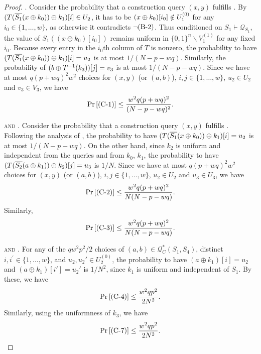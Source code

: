 \begin{proof}
\smallskip
\noindent \textsc{\cone}. Consider the probability that a construction query $(x,y)$ fulfills \cone. By $(T(\overline{S_1}(x\oplus k_0))\oplus k_1)[i]\in U_2$, it has to be $(x\oplus k_0)[i_0]\notin U_1^{(0)}$ for any $i_0\in\{1,\ldots,w\}$, as otherwise it contradicts $\neg\text{(B-2)}$. Thus conditioned on $S_{1} \vdash \mathcal{Q}_{S_{1}}$, the value of $S_1((x \oplus k_0)[i_0])$ remains uniform in $\{0, 1\}^{n} \backslash V_1^{(1)}$ for any fixed $i_0$. Because every entry in the $i_{0}$th column of $T$ is nonzero, the probability to have $(T(\overline{S_1}(x\oplus k_0))\oplus k_1)[i]=u_2$ is at most $1/(N-p-wq)$. Similarly, the probability of $(b\oplus T^{-1}(k_3))[j] = v_3$ is at most $1/(N-p-wq)$. Since we have at most $q(p+wq)^2w^2$ choices for $(x,y)$ (or $(a, b)$), $i, j \in\{1, \ldots, w\}$, $u_{2} \in U_{2}$ and $v_{3} \in V_{3}$, we have
%
%
$$
\operatorname{Pr}\left[\text{(C-1)}\right] \leq \frac{w^{2} q (p+w q)^{2}}{(N-p-wq)^{2}}.
$$



\smallskip
\noindent \textsc{\ctwo and \cthree}. Consider the probability that a construction query $(x,y)$ fulfills \ctwo. Following the analysis of \cone, the probability to have $(T(\overline{S_1}(x\oplus k_0))\oplus k_1)[i]=u_2$ is at most $1/(N-p-wq)$. On the other hand, since $k_{2}$ is uniform and independent from the queries and from $k_{0}$, $k_{1}$, the probability to have $(T(\overline{S_2}(a \oplus k_1))\oplus k_2)[j] = u_3$ is $1/N$. Since we have at most $q(p+wq)^2w^2$ choices for $(x,y)$ (or $(a, b)$), $i, j \in\{1, \ldots, w\}$, $u_{2} \in U_{2}$ and $u_{3} \in U_{3}$, we have
%
%
$$
\operatorname{Pr}\left[\text{(C-2)}\right] \leq \frac{w^{2} q (p+w q)^{2}}{N  (N-p-wq)}.
$$
%
Similarly,
%
$$
\operatorname{Pr}\left[\text{(C-3)}\right] \leq \frac{w^{2} q (p+w q)^{2}}{N  (N-p-wq)}.
$$




\smallskip
\noindent \textsc{\cfour and \cseven}. For any of the $qw^2p^2/2$ choices of $(a, b) \in \mathcal{Q}_{C}^{*}\left(S_{1}, S_{4}\right)$, distinct $i, i^{\prime}\in\{1, \ldots, w\}$, and $u_{2},u_{2}' \in U_{2}^{(0)}$, the probability to have $(a \oplus k_1)[i] = u_2$ and $(a \oplus k_1)[i'] = u_2'$ is $1/N^2$, since $k_1$ is uniform and independent of $S_1$. By these, we have
%
$$
\operatorname{Pr}\left[\text{(C-4)}\right] \leq \frac{w^2qp^2}{2N^2}.
$$
Similarly, using the uniformness of $k_3$, we have
%
$$
\operatorname{Pr}\left[\text{(C-7)}\right] \leq \frac{w^2qp^2}{2N^2}.
$$




%
%
%
%
%











\end{proof}
